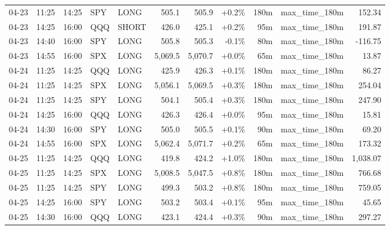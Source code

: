 \documentclass[11pt,a4paper,twoside]{article}
\begin{document}
\begin{center}
\begin{longtable}{>{\color{txtmain}}l l l l l r r r r >{\color{txtmain}}l r}
04-23 & 11:25 & 14:25 & SPY & LONG & 505.1 & 505.9 & \textcolor{wingreen}{+0.2\%} & 180m & max\_time\_180m & \textcolor{wingreen}{152.34} \\
04-23 & 14:25 & 16:00 & QQQ & SHORT & 426.0 & 425.1 & \textcolor{wingreen}{+0.2\%} & 95m & max\_time\_180m & \textcolor{wingreen}{191.87} \\
04-23 & 14:40 & 16:00 & SPY & LONG & 505.8 & 505.3 & \textcolor{lossred}{-0.1\%} & 80m & max\_time\_180m & \textcolor{lossred}{-116.75} \\
04-23 & 14:55 & 16:00 & SPX & LONG & 5,069.5 & 5,070.7 & \textcolor{wingreen}{+0.0\%} & 65m & max\_time\_180m & \textcolor{wingreen}{13.87} \\
04-24 & 11:25 & 14:25 & QQQ & LONG & 425.9 & 426.3 & \textcolor{wingreen}{+0.1\%} & 180m & max\_time\_180m & \textcolor{wingreen}{86.27} \\
04-24 & 11:25 & 14:25 & SPX & LONG & 5,056.1 & 5,069.5 & \textcolor{wingreen}{+0.3\%} & 180m & max\_time\_180m & \textcolor{wingreen}{254.04} \\
04-24 & 11:25 & 14:25 & SPY & LONG & 504.1 & 505.4 & \textcolor{wingreen}{+0.3\%} & 180m & max\_time\_180m & \textcolor{wingreen}{247.90} \\
04-24 & 14:25 & 16:00 & QQQ & LONG & 426.3 & 426.4 & \textcolor{wingreen}{+0.0\%} & 95m & max\_time\_180m & \textcolor{wingreen}{15.81} \\
04-24 & 14:30 & 16:00 & SPY & LONG & 505.0 & 505.5 & \textcolor{wingreen}{+0.1\%} & 90m & max\_time\_180m & \textcolor{wingreen}{69.20} \\
04-24 & 14:55 & 16:00 & SPX & LONG & 5,062.4 & 5,071.7 & \textcolor{wingreen}{+0.2\%} & 65m & max\_time\_180m & \textcolor{wingreen}{173.32} \\
04-25 & 11:25 & 14:25 & QQQ & LONG & 419.8 & 424.2 & \textcolor{wingreen}{+1.0\%} & 180m & max\_time\_180m & \textcolor{wingreen}{1,038.07} \\
04-25 & 11:25 & 14:25 & SPX & LONG & 5,008.5 & 5,047.5 & \textcolor{wingreen}{+0.8\%} & 180m & max\_time\_180m & \textcolor{wingreen}{766.68} \\
04-25 & 11:25 & 14:25 & SPY & LONG & 499.3 & 503.2 & \textcolor{wingreen}{+0.8\%} & 180m & max\_time\_180m & \textcolor{wingreen}{759.05} \\
04-25 & 14:25 & 16:00 & SPY & LONG & 503.2 & 503.4 & \textcolor{wingreen}{+0.1\%} & 95m & max\_time\_180m & \textcolor{wingreen}{45.65} \\
04-25 & 14:30 & 16:00 & QQQ & LONG & 423.1 & 424.4 & \textcolor{wingreen}{+0.3\%} & 90m & max\_time\_180m & \textcolor{wingreen}{297.27} \\

\end{longtable}
\end{center}
\end{document}
